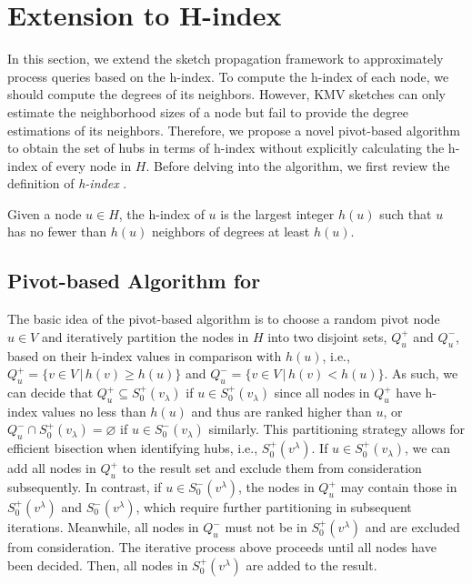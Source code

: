 \section{Extension to H-index}
\label{sec:hindex}

In this section, we extend the sketch propagation framework to approximately process \ced queries based on the h-index.
To compute the h-index of each node, we should compute the degrees of its neighbors.
However, KMV sketches can only estimate the neighborhood sizes of a node but fail to provide the degree estimations of its neighbors.
Therefore, we propose a novel pivot-based algorithm to obtain the set of hubs in terms of h-index without explicitly calculating the h-index of every node in $H$.
Before delving into the algorithm, we first review the definition of \emph{h-index} \cite{LuZZS16}.
\begin{definition}[h-index]
  Given a node $u \in H$, the h-index of $u$ is the largest integer $h(u)$ such that $u$ has no fewer than $h(u)$ neighbors of degrees at least $h(u)$.
\end{definition}

\subsection{Pivot-based Algorithm for \ced}
\label{sec:hindex-global}

The basic idea of the pivot-based algorithm is to choose a random pivot node $u \in V$ and iteratively partition the nodes in $H$ into two disjoint sets, $Q^+_u$ and $Q^-_u$, based on their h-index values in comparison with $h(u)$, i.e., $Q^+_u = \{v \in V \,|\, h(v) \geq h(u)\}$ and $Q^-_u = \{v \in V \,|\, h(v) < h(u)\}$.
As such, we can decide that $Q^+_u \subseteq S^+_0(v_\lambda)$ if $u \in S^+_0(v_\lambda)$ since all nodes in $Q^+_u$ have h-index values no less than $h(u)$ and thus are ranked higher than $u$, or $Q^-_u \cap S^+_0(v_\lambda) = \varnothing$ if $u \in S^-_0(v_\lambda)$ similarly.
This partitioning strategy allows for efficient bisection when identifying hubs, i.e., $S^+_0(v^\lambda)$.
If $u \in S^+_0(v_\lambda)$, we can add all nodes in $Q^+_u$ to the result set and exclude them from consideration subsequently.
In contrast, if $u \in S^-_0(v^\lambda)$, the nodes in $Q^+_u$ may contain those in $S^+_0(v^\lambda)$ and $S^-_0(v^\lambda)$, which require further partitioning in subsequent iterations. Meanwhile, all nodes in $Q^-_u$ must not be in $S^+_0(v^\lambda)$ and are excluded from consideration.
The iterative process above proceeds until all nodes have been decided.
Then, all nodes in $S^+_0(v^\lambda)$ are added to the result.

